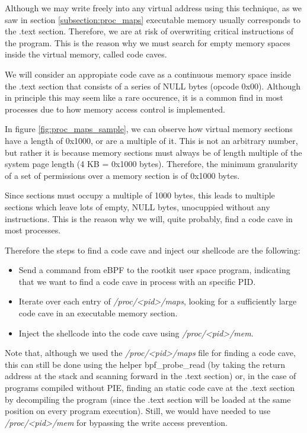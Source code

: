 Although we may write freely into any virtual address using this technique, as we saw in section \ref{subsection:proc_maps} executable memory usually corresponds to the .text section. Therefore, we are at risk of overwriting critical instructions of the program. This is the reason why we must search for empty memory spaces inside the virtual memory, called code caves.

We will consider an appropiate code cave as a continuous memory space inside the .text section that consists of a series of NULL bytes (opcode 0x00). Although in principle this may seem like a rare occurence, it is a common find in most processes due to how memory access control is implemented.

In figure \ref{fig:proc_maps_sample}, we can observe how virtual memory sections have a length of 0x1000, or are a multiple of it. This is not an arbitrary number, but rather it is because memory sections must always be of length multiple of the system page length (4 KB = 0x1000 bytes). Therefore, the minimum granularity of a set of permissions over a memory section is of 0x1000 bytes.

Since sections must occupy a multiple of 1000 bytes, this leads to multiple sections which leave lots of empty, NULL bytes, unocuppied without any instructions. This is the reason why we will, quite probably, find a code cave in most processes.

Therefore the steps to find a code cave and inject our shellcode are the following:
\begin{itemize}
\item Send a command from eBPF to the rootkit user space program, indicating that we want to find a code cave in process with an specific PID.
\item Iterate over each entry of \textit{/proc/<pid>/maps}, looking for a sufficiently large code cave in an executable memory section.
\item Inject the shellcode into the code cave using \textit{/proc/<pid>/mem}.
\end{itemize}

Note that, although we used the \textit{/proc/<pid>/maps} file for finding a code cave, this can still be done using the helper bpf\_probe\_read (by taking the return address at the stack and scanning forward in the .text section) or, in the case of programs compiled without PIE, finding an static code cave at the .text section by decompiling the program (since the .text section will be loaded at the same position on every program execution). Still, we would have needed to use \textit{/proc/<pid>/mem} for bypassing the write access prevention.


